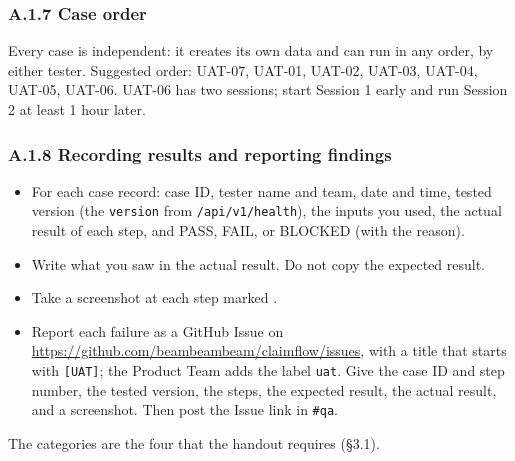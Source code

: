 \subsubsection*{A.1.7 Case order}

Every case is independent: it creates its own data and can run in any order, by either tester. Suggested order: UAT-07, UAT-01, UAT-02, UAT-03, UAT-04, UAT-05, UAT-06. UAT-06 has two sessions; start Session 1 early and run Session 2 at least 1 hour later.

\subsubsection*{A.1.8 Recording results and reporting findings}

\begin{itemize}
\tightlist
\item
  For each case record: case ID, tester name and team, date and time, tested version (the \texttt{version} from \texttt{/api/v1/health}), the inputs you used, the actual result of each step, and PASS, FAIL, or BLOCKED (with the reason).
\item
  Write what you saw in the actual result. Do not copy the expected result.
\item
  Take a screenshot at each step marked \shot{}.
\item
  Report each failure as a GitHub Issue on \url{https://github.com/beambeambeam/claimflow/issues}, with a title that starts with \texttt{{[}UAT{]}}; the Product Team adds the label \texttt{uat}. Give the case ID and step number, the tested version, the steps, the expected result, the actual result, and a screenshot. Then post the Issue link in \texttt{\#qa}.
\end{itemize}


The categories are the four that the handout requires (§3.1).

